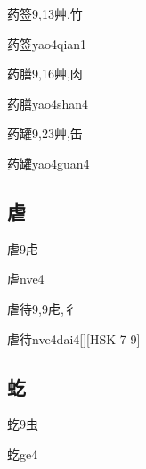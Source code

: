 \begin{Entry}{药签}{9,13}{⾋,⽵}
  \begin{Phonetics}{药签}{yao4qian1}
  \end{Phonetics}
\end{Entry}

\begin{Entry}{药膳}{9,16}{⾋,⾁}
  \begin{Phonetics}{药膳}{yao4shan4}
  \end{Phonetics}
\end{Entry}

\begin{Entry}{药罐}{9,23}{⾋,⽸}
  \begin{Phonetics}{药罐}{yao4guan4}
  \end{Phonetics}
\end{Entry}

\subsection*{虐}

\begin{Entry}{虐}{9}{⾌}
  \begin{Phonetics}{虐}{nve4}
  \end{Phonetics}
\end{Entry}

\begin{Entry}{虐待}{9,9}{⾌,⼻}
  \begin{Phonetics}{虐待}{nve4dai4}[][HSK 7-9]
  \end{Phonetics}
\end{Entry}

\subsection*{虼}

\begin{Entry}{虼}{9}{⾍}
  \begin{Phonetics}{虼}{ge4}
  \end{Phonetics}
\end{Entry}

